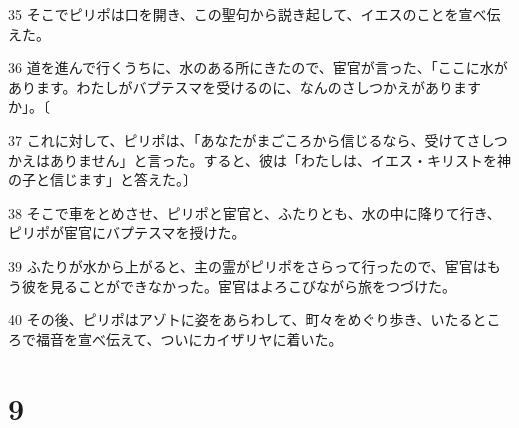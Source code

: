 \par 35 そこでピリポは口を開き、この聖句から説き起して、イエスのことを宣べ伝えた。
\par 36 道を進んで行くうちに、水のある所にきたので、宦官が言った、「ここに水があります。わたしがバプテスマを受けるのに、なんのさしつかえがありますか」。〔
\par 37 これに対して、ピリポは、「あなたがまごころから信じるなら、受けてさしつかえはありません」と言った。すると、彼は「わたしは、イエス・キリストを神の子と信じます」と答えた。〕
\par 38 そこで車をとめさせ、ピリポと宦官と、ふたりとも、水の中に降りて行き、ピリポが宦官にバプテスマを授けた。
\par 39 ふたりが水から上がると、主の霊がピリポをさらって行ったので、宦官はもう彼を見ることができなかった。宦官はよろこびながら旅をつづけた。
\par 40 その後、ピリポはアゾトに姿をあらわして、町々をめぐり歩き、いたるところで福音を宣べ伝えて、ついにカイザリヤに着いた。

\chapter{9}

